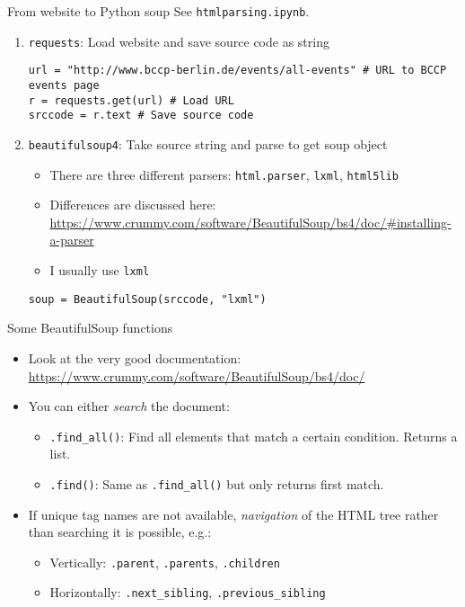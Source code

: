 \begin{frame}[fragile]{From website to Python soup}
See \texttt{htmlparsing.ipynb}.
\begin{enumerate}
	\item \texttt{requests}: Load website and save source code as string
\begin{verbatim}
url = "http://www.bccp-berlin.de/events/all-events" # URL to BCCP events page
r = requests.get(url) # Load URL
srccode = r.text # Save source code
\end{verbatim}
	\item \texttt{beautifulsoup4}: Take source string and parse to get soup object
		\begin{itemize}
			\item There are three different parsers: \texttt{html.parser}, \texttt{lxml}, \texttt{html5lib}
			\item Differences are discussed here: \url{https://www.crummy.com/software/BeautifulSoup/bs4/doc/#installing-a-parser}
			\item I usually use \texttt{lxml}
		\end{itemize}
\begin{verbatim}
soup = BeautifulSoup(srccode, "lxml")
\end{verbatim}
\end{enumerate}
\end{frame}

\begin{frame}[fragile]{Some BeautifulSoup functions}
\begin{itemize}
	\item Look at the very good documentation: \url{https://www.crummy.com/software/BeautifulSoup/bs4/doc/}
	\item You can either \textit{search} the document:
	\begin{itemize}
		\item \texttt{.find_all()}: Find all elements that match a certain condition. Returns a list.
		\item \texttt{.find()}: Same as \texttt{.find_all()} but only returns first match.
	\end{itemize}
	\item If unique tag names are not available, \textit{navigation} of the HTML tree rather than searching it is possible, e.g.:
	\begin{itemize}
		\item Vertically: \texttt{.parent}, \texttt{.parents}, \texttt{.children}
		\item Horizontally: \texttt{.next_sibling}, \texttt{.previous_sibling}
	\end{itemize}
\end{itemize}
\end{frame}